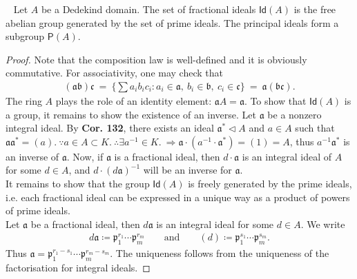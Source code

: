 \documentclass[12pt,a4paper,footinclude=true,headinclude=true]{scrbook} %
\newenvironment{theorem}[2][]
{\renewcommand\theinnercustomthm{#2}\innercustomthm[#1]
\begin{mdframed}[backgroundcolor=yellow!20]\ }
{\end{mdframed}\endinnercustomthm}
\begin{document}
\begin{theorem}{139}
    Let $A$ be a Dedekind domain. The set of fractional ideals $\mathsf{Id}(A)$ is the free abelian group generated by the set of prime ideals. The principal ideals form a subgroup $\mathsf{P}(A)$.
\end{theorem}
\begin{proof}
    Note that the composition law is well-defined and it is obviously commutative. For associativity, one may check that
    \begin{align*}
        (\mathfrak{a}\mathfrak{b})\mathfrak{c}\ =\ 
        \{\sum a_ib_ic_i:a_i\in\mathfrak{a},\ b_i\in\mathfrak{b},\ c_i\in\mathfrak{c}\}\ =\ \mathfrak{a}(\mathfrak{b}\mathfrak{c}).
    \end{align*}
    The ring $A$ plays the role of an identity element: $\mathfrak{a}A= \mathfrak{a}$. To show that $\mathsf{Id}(A)$ is a group, it remains to show the existence of an inverse. 
    Let $\mathfrak{a}$ be a nonzero integral ideal. By \textbf{Cor. 132}, there exists an ideal $\mathfrak{a}^\ast\triangleleft A$ and $a\in A$ such that $\mathfrak{a}\mathfrak{a}^\ast=(a).\ \because a\in A\subset K.\ \therefore \exists a^{-1}\in K.\ \Rightarrow \mathfrak{a}\cdot(a^{-1}\cdot \mathfrak{a}^\ast)=(1)=A$, thus $a^{-1}\mathfrak{a}^\ast$ is an inverse of $\mathfrak{a}$. Now, if $\mathfrak{a}$ is a fractional ideal, then $d\cdot\mathfrak{a}$ is an integral ideal of $A$ for some $d\in A$, and $d\cdot(d\mathfrak{a})^{-1}$ will be an inverse for $\mathfrak{a}$. \\
    It remains to show that the group $\mathsf{Id}(A)$ is freely generated by the prime ideals, i.e. each fractional ideal can be expressed in a unique way as a product of powers of prime ideals. \\
    Let $\mathfrak{a}$ be a fractional ideal, then $d\mathfrak{a}$ is an integral ideal for some $d\in A$. We write
    \begin{align*}
        d\mathfrak{a}\coloneqq\mathfrak{p}_1^{r_1}\cdots\mathfrak{p}_m^{r_m}
        \qquad\text{and}\qquad (d)\coloneqq \mathfrak{p}_1^{s_1}\cdots\mathfrak{p}_m^{s_m}.
    \end{align*}
    Thus $\mathfrak{a}=\mathfrak{p}_1^{r_1-s_1}\cdots\mathfrak{p}_m^{r_m-s_m}$. The uniqueness follows from the uniqueness of the factorisation for integral ideals.
\end{proof}
\end{document}
